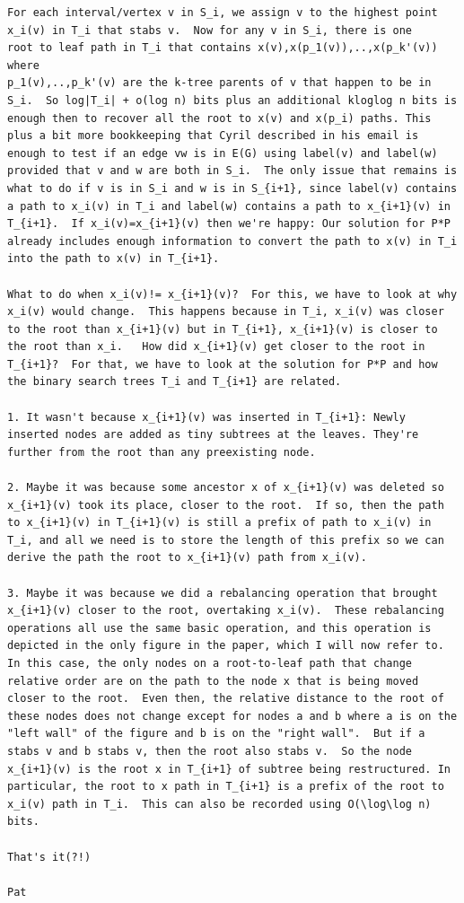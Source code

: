 \documentclass[kpfonts]{patmorin}
\begin{document}
\begin{verbatim}
For each interval/vertex v in S_i, we assign v to the highest point 
x_i(v) in T_i that stabs v.  Now for any v in S_i, there is one 
root to leaf path in T_i that contains x(v),x(p_1(v)),..,x(p_k'(v)) where
p_1(v),..,p_k'(v) are the k-tree parents of v that happen to be in
S_i.  So log|T_i| + o(log n) bits plus an additional kloglog n bits is
enough then to recover all the root to x(v) and x(p_i) paths. This
plus a bit more bookkeeping that Cyril described in his email is
enough to test if an edge vw is in E(G) using label(v) and label(w)
provided that v and w are both in S_i.  The only issue that remains is
what to do if v is in S_i and w is in S_{i+1}, since label(v) contains
a path to x_i(v) in T_i and label(w) contains a path to x_{i+1}(v) in
T_{i+1}.  If x_i(v)=x_{i+1}(v) then we're happy: Our solution for P*P
already includes enough information to convert the path to x(v) in T_i
into the path to x(v) in T_{i+1}.

What to do when x_i(v)!= x_{i+1}(v)?  For this, we have to look at why
x_i(v) would change.  This happens because in T_i, x_i(v) was closer
to the root than x_{i+1}(v) but in T_{i+1}, x_{i+1}(v) is closer to
the root than x_i.   How did x_{i+1}(v) get closer to the root in
T_{i+1}?  For that, we have to look at the solution for P*P and how
the binary search trees T_i and T_{i+1} are related.

1. It wasn't because x_{i+1}(v) was inserted in T_{i+1}: Newly
inserted nodes are added as tiny subtrees at the leaves. They're
further from the root than any preexisting node.

2. Maybe it was because some ancestor x of x_{i+1}(v) was deleted so
x_{i+1}(v) took its place, closer to the root.  If so, then the path
to x_{i+1}(v) in T_{i+1}(v) is still a prefix of path to x_i(v) in
T_i, and all we need is to store the length of this prefix so we can
derive the path the root to x_{i+1}(v) path from x_i(v).

3. Maybe it was because we did a rebalancing operation that brought
x_{i+1}(v) closer to the root, overtaking x_i(v).  These rebalancing
operations all use the same basic operation, and this operation is
depicted in the only figure in the paper, which I will now refer to.
In this case, the only nodes on a root-to-leaf path that change
relative order are on the path to the node x that is being moved
closer to the root.  Even then, the relative distance to the root of
these nodes does not change except for nodes a and b where a is on the
"left wall" of the figure and b is on the "right wall".  But if a
stabs v and b stabs v, then the root also stabs v.  So the node
x_{i+1}(v) is the root x in T_{i+1} of subtree being restructured. In
particular, the root to x path in T_{i+1} is a prefix of the root to
x_i(v) path in T_i.  This can also be recorded using O(\log\log n)
bits.

That's it(?!)

Pat
\end{verbatim}
  
  


\end{document}
